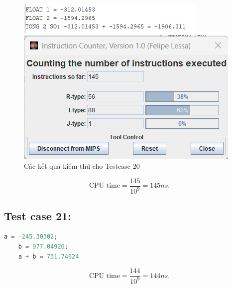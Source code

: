 \begin{figure}[!h]
    \centering
    \begin{minipage}[b]{0.48\textwidth}
        \centering
        \includegraphics[width=\textwidth]{image/TESTCASE/Testcase 20.png}
    \end{minipage}
    \hfill
    \begin{minipage}[b]{0.48\textwidth}
        \centering
        \includegraphics[width=\textwidth]{image/TESTCASE/Instruction Counter 20.png}
    \end{minipage}
    \vspace{0.5cm}
    \caption{Các kết quả kiểm thử cho Testcase 20}
\end{figure}
\[
\text{CPU time} = \frac{\text{145}}{10^9} = 145 ns.
\]

\vspace{0.5cm}

\subsection{Test case 21:}
\begin{lstlisting}[language=Python]
    a = -245.30302;
    b = 977.04926;
    a + b = 731.74624
\end{lstlisting}
\[
\text{CPU time} = \frac{\text{144}}{10^9} = 144  ns.
\]

